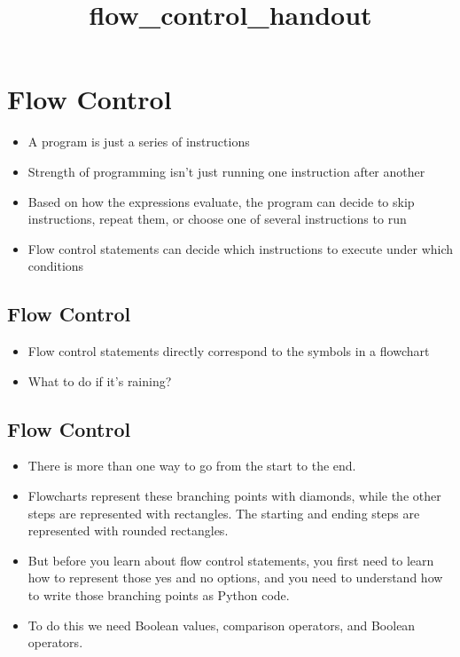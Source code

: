 \documentclass[11pt]{article}
\title{flow\_control\_handout}
\providecommand{\tightlist}{%
      \setlength{\itemsep}{0pt}\setlength{\parskip}{0pt}}
\begin{document}
    
    
    \maketitle
    
    

    
    \hypertarget{flow-control}{%
\section{Flow Control}\label{flow-control}}

\begin{itemize}
\tightlist
\item
  A program is just a series of instructions
\item
  Strength of programming isn't just running one instruction after
  another
\item
  Based on how the expressions evaluate, the program can decide to skip
  instructions, repeat them, or choose one of several instructions to
  run
\item
  Flow control statements can decide which instructions to execute under
  which conditions
\end{itemize}

    \hypertarget{flow-control}{%
\subsection{Flow Control}\label{flow-control}}

\begin{itemize}
\tightlist
\item
  Flow control statements directly correspond to the symbols in a
  flowchart
\item
  What to do if it's raining?
\end{itemize}

    \hypertarget{flow-control}{%
\subsection{Flow Control}\label{flow-control}}

\begin{itemize}
\item
  There is more than one way to go from the start to the end.
\item
  Flowcharts represent these branching points with diamonds, while the
  other steps are represented with rectangles. The starting and ending
  steps are represented with rounded rectangles.
\item
  But before you learn about flow control statements, you first need to
  learn how to represent those yes and no options, and you need to
  understand how to write those branching points as Python code.
\item
  To do this we need Boolean values, comparison operators, and Boolean
  operators.
\end{itemize}
\end{document}
